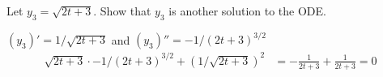 Let $y_3 = \sqrt{2t+3}$. Show that $y_3$ is another solution to the ODE.


\soln* $(y_3)' = 1/\sqrt{2t+3}$ and $(y_3)'' = -1/(2t+3)^{3/2}$
\begin{align*}
    \sqrt{2t+3} \cdot -1/(2t+3)^{3/2} + (1/\sqrt{2t+3})^2 &= -\frac{1}{2t+3} + \frac{1}{2t+3} = 0
\end{align*}
